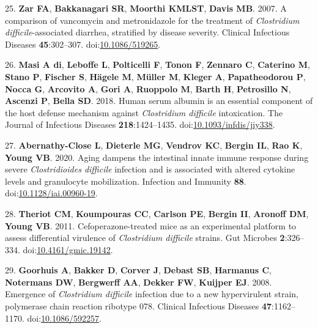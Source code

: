 \documentclass[
  12pt,
]{article}
\newenvironment{cslreferences}%
  {}%
  {\par}
\begin{document}
\begin{cslreferences}
\leavevmode\hypertarget{ref-Zar2007}{}%
25. \textbf{Zar FA}, \textbf{Bakkanagari SR}, \textbf{Moorthi KMLST},
\textbf{Davis MB}. 2007. A comparison of vancomycin and metronidazole
for the treatment of \emph{Clostridium difficile}-associated diarrhea,
stratified by disease severity. Clinical Infectious Diseases
\textbf{45}:302--307.
doi:\href{https://doi.org/10.1086/519265}{10.1086/519265}.

\leavevmode\hypertarget{ref-diMasi2018}{}%
26. \textbf{Masi A di}, \textbf{Leboffe L}, \textbf{Polticelli F},
\textbf{Tonon F}, \textbf{Zennaro C}, \textbf{Caterino M}, \textbf{Stano
P}, \textbf{Fischer S}, \textbf{Hägele M}, \textbf{Müller M},
\textbf{Kleger A}, \textbf{Papatheodorou P}, \textbf{Nocca G},
\textbf{Arcovito A}, \textbf{Gori A}, \textbf{Ruoppolo M}, \textbf{Barth
H}, \textbf{Petrosillo N}, \textbf{Ascenzi P}, \textbf{Bella SD}. 2018.
Human serum albumin is an essential component of the host defense
mechanism against \emph{Clostridium difficile} intoxication. The Journal
of Infectious Diseases \textbf{218}:1424--1435.
doi:\href{https://doi.org/10.1093/infdis/jiy338}{10.1093/infdis/jiy338}.

\leavevmode\hypertarget{ref-AbernathyClose2020}{}%
27. \textbf{Abernathy-Close L}, \textbf{Dieterle MG}, \textbf{Vendrov
KC}, \textbf{Bergin IL}, \textbf{Rao K}, \textbf{Young VB}. 2020. Aging
dampens the intestinal innate immune response during severe
\emph{Clostridioides difficile} infection and is associated with altered
cytokine levels and granulocyte mobilization. Infection and Immunity
\textbf{88}.
doi:\href{https://doi.org/10.1128/iai.00960-19}{10.1128/iai.00960-19}.

\leavevmode\hypertarget{ref-Theriot2011}{}%
28. \textbf{Theriot CM}, \textbf{Koumpouras CC}, \textbf{Carlson PE},
\textbf{Bergin II}, \textbf{Aronoff DM}, \textbf{Young VB}. 2011.
Cefoperazone-treated mice as an experimental platform to assess
differential virulence of \emph{Clostridium difficile} strains. Gut
Microbes \textbf{2}:326--334.
doi:\href{https://doi.org/10.4161/gmic.19142}{10.4161/gmic.19142}.

\leavevmode\hypertarget{ref-Goorhuis2008}{}%
29. \textbf{Goorhuis A}, \textbf{Bakker D}, \textbf{Corver J},
\textbf{Debast SB}, \textbf{Harmanus C}, \textbf{Notermans DW},
\textbf{Bergwerff AA}, \textbf{Dekker FW}, \textbf{Kuijper EJ}. 2008.
Emergence of \emph{Clostridium difficile} infection due to a new
hypervirulent strain, polymerase chain reaction ribotype 078. Clinical
Infectious Diseases \textbf{47}:1162--1170.
doi:\href{https://doi.org/10.1086/592257}{10.1086/592257}.


\end{cslreferences}
\end{document}
